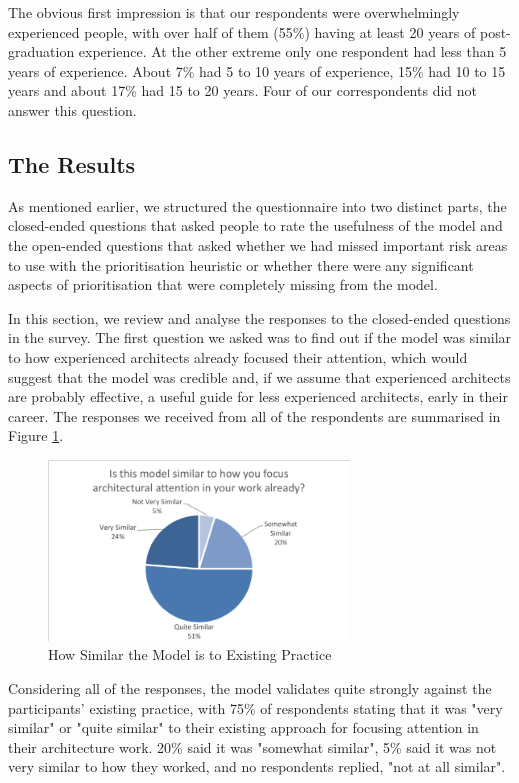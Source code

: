 The obvious first impression is that our respondents were overwhelmingly experienced people, with over half of them (55\%) having at least 20 years of post-graduation experience.  At the other extreme only one respondent had less than 5 years of experience.  About 7\% had 5 to 10 years of experience, 15\% had 10 to 15 years and about 17\% had 15 to 20 years.  Four of our correspondents did not answer this question.

\subsection{The Results}

As mentioned earlier, we structured the questionnaire into two distinct parts, the closed-ended questions that asked people to rate the usefulness of the model and the open-ended questions that asked whether we had missed important risk areas to use with the prioritisation heuristic or whether there were any significant aspects of prioritisation that were completely missing from the model.

In this section, we review and analyse the responses to the closed-ended questions in the survey.
The first question we asked was to find out if the model was similar to how experienced architects already focused their attention, which would suggest that the model was credible and, if we assume that experienced architects are probably effective, a useful guide for less experienced architects, early in their career.  The responses we received from all of the respondents are summarised in Figure \ref{figure:similarity}.
 
\begin{figure}
\centering
\includegraphics[width=8cm,trim={2 2 2 2},clip]{Figures/prioritisation-similarity}
\caption{How Similar the Model is to Existing Practice}
\label{figure:similarity}
\end{figure}

Considering all of the responses, the model validates quite strongly against the participants' existing practice, with 75\% of respondents stating that it was "very similar" or "quite similar" to their existing approach for focusing attention in their architecture work.  20\% said it was "somewhat similar", 5\% said it was not very similar to how they worked, and no respondents replied, "not at all similar".

